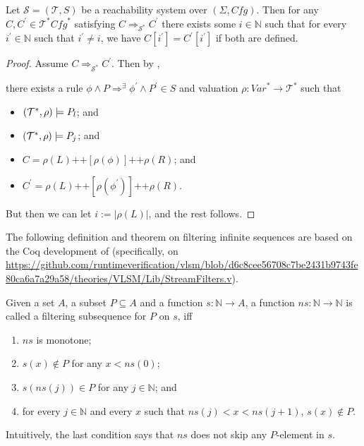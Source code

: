 \begin{lemma}\label{lem:atMostOneComponentChanges}
    Let $\mathcal{S} = (\mathcal{T}, S)$ be a reachability system over $(\Sigma, \mathit{Cfg})$.
    Then for any $C,C^\prime \in \mathcal{T}^*{\mathit{Cfg}^*}$ satisfying $C \Rightarrow_{\mathcal{S}^*} C^\prime$
    there exists some $i \in \mathbb{N}$ such that
    for every $i^\prime \in \mathbb{N}$ such that $i^\prime \not = i$,
    we have $C[i^\prime] = C^\prime[i^\prime]$ if both are defined.
\end{lemma}
\begin{proof}
Assume $C \Rightarrow_{\mathcal{S}^*} C^\prime$.
Then by ,
\begin{proofenv}
    there exists a rule $\phi \land P \Rightarrow^\exists \phi^\prime \land P^\prime \in S$
    and valuation $\rho : \mathit{Var}^* \to \mathcal{T}^*$ such that
    \begin{itemize}
        \item $(\mathcal{T}^*, \rho) \models P_l$; and
        \item $(\mathcal{T}^*, \rho) \models P_j$; and
        \item $C = \rho(L) \texttt{++} [\rho(\phi)] \texttt{++} \rho(R)$; and
        \item $C^\prime = \rho(L) \texttt{++} [\rho(\phi^\prime)] 
        \texttt{++} \rho(R)$.
    \end{itemize}
\end{proofenv}
But then we can let $i := |\rho(L)|$, and the rest follows.
\end{proof}


The following definition and theorem on filtering infinite sequences
are based on the Coq development of \cite{ZamfirVLSM}
(specifically, on \url{https://github.com/runtimeverification/vlsm/blob/d6c8cee56708c7be2431b9743fe80ca6a7a29a58/theories/VLSM/Lib/StreamFilters.v}).
\begin{definition}\label{def:filteringSubsequence}
Given a set $A$, a subset $P \subseteq A$ and a function $s : \mathbb{N} \to A$,
a function $\mathit{ns} : \mathbb{N} \to \mathbb{N}$ is called a filtering subsequence for $P$ on $s$,
iff
\begin{enumerate}
    \item $\mathit{ns}$ is monotone;
    \item $s(x) \not \in P$ for any $x < ns(0)$;
    \item $s(\mathit{ns}(j)) \in P$ for any $j \in \mathbb{N}$; and
    \item for every $j \in \mathbb{N}$ and every $x$ such that $\mathit{ns}(j) < x < \mathit{ns}(j+1)$,
          $s(x) \not\in P$.
\end{enumerate}
Intuitively, the last condition says that $ns$ does not skip any $P$-element in $s$.
\end{definition}

